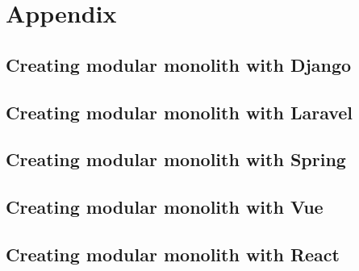 \chapter{Appendix}

\section{Creating modular monolith with Django}
\label{sec:DjangoImpl}


\section{Creating modular monolith with Laravel}
\label{sec:LaravelImpl}


\section{Creating modular monolith with Spring}
\label{sec:SpringImpl}


\section{Creating modular monolith with Vue}
\label{sec:VueImpl}


\section{Creating modular monolith with React}
\label{sec:ReactImpl}

